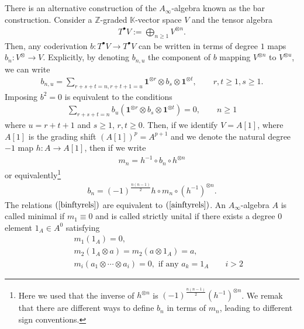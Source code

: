 \documentclass[a4paper,11pt]{article}
\numberwithin{equation}{section}
\begin{document}
\\\\
There is an alternative construction of the $A_{\infty}$-algebra known as the 
bar construction. Consider a $\mathbb{Z}$-graded $\mathbb{K}$-vector space $V$ 
and the tensor algebra
\begin{eqnarray}
T^{\bullet}V:=\bigoplus_{n\geq 1}V^{\otimes n}.
\end{eqnarray}
Then, any coderivation $b:T^{\bullet}V\rightarrow T^{\bullet}V$ can be written 
in terms of degree $1$ maps $b_{n}:V^{\otimes}\rightarrow V$. Explicitly, by 
denoting $b_{n,u}$ the component of $b$ mapping $V^{\otimes n}$ to $
V^{\otimes u}$, we can write
\begin{eqnarray}
b_{n,u}=\sum_{r+s+t=n,r+t+1=u}\mathbf{1}^{\otimes r}\otimes 
b_{s}\otimes 
\mathbf{1}^{\otimes t},\qquad r,t\geq 1,s\geq 1.
\end{eqnarray}
Imposing $b^{2}=0$ is equivalent to the conditions
\begin{eqnarray}\label{binftyrels}
\sum_{r+s+t=n}b_{u}(\mathbf{1}^{\otimes r}\otimes b_{s}\otimes 
\mathbf{1}^{\otimes t})=0,\qquad n\geq 1
\end{eqnarray}
where $u=r+t+1$ and $s\geq 1$, $r,t\geq 0$. Then, if we identify $V=A[1]$, 
where $A[1]$ is the grading shift $(A[1])^{p}=A^{p+1}$ and we denote the 
natural degree $-1$ map $h:A\rightarrow A[1]$, then if we write 
\begin{eqnarray}
m_{n}=h^{-1}\circ b_{n}\circ h^{\otimes n}
\end{eqnarray}
or equivalently\footnote{Here we used that the inverse of $h^{\otimes n}$ is 
$(-1)^{\frac{n(n-1)}{2}}(h^{-1})^{\otimes n}$. We remak that there are 
different ways to define $b_{n}$ in terms of $m_{n}$, leading to different sign 
conventions.}
\begin{eqnarray}
b_{n}=(-1)^{\frac{n(n-1)}{2}}h\circ m_{n}\circ (h^{-1})^{\otimes n}.
\end{eqnarray}
The relations $(\ref{binftyrels})$ are equivalent to $(\ref{ainftyrels})$. An 
$A_{\infty}$-algebra $A$ is called minimal if $m_{1}\equiv 0$ and is called 
strictly unital if there exists a degree $0$ element $1_{A}\in A^{0}$ satisfying
\begin{eqnarray}\label{unital cdts}
&& m_{1}(1_{A})=0,\nonumber\\
&& m_{2}(1_{A}\otimes a)=m_{2}(a\otimes 1_{A})=a,\nonumber\\
&& m_{i}(a_{1}\otimes\cdots\otimes a_{i})=0, \text{ \ if any\ 
}a_{k}=1_{A}\qquad 
i>2
\end{eqnarray}
\end{document}
